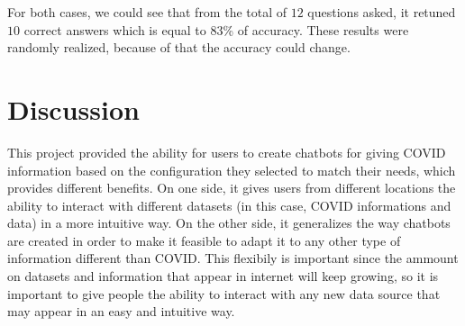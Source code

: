 \documentclass[]{article}
\begin{document}
\begin{table}[h]
  \caption{\label{tab:ev-spanish}Evaluation for Spanish Chatbot}
\end{table}

\newpage

For both cases, we could see that from the total of $ 12 $ questions asked, it retuned $ 10 $ correct answers which is equal to 83\% of accuracy. These results were randomly realized, because of that the accuracy could change.

\section*{Discussion}
This project provided the ability for users to create chatbots for giving COVID information based on the configuration they selected to match their needs, which provides different benefits. On one side, it gives users from different locations the ability to interact with different datasets (in this case, COVID informations and data) in a more intuitive way. On the other side, it generalizes the way chatbots are created in order to make it feasible to adapt it to any other type of information different than COVID. This flexibily is important since the ammount on datasets and information that appear in internet will keep growing, so it is important to give people the ability to interact with any new data source that may appear in an easy and intuitive way.
\end{document}
